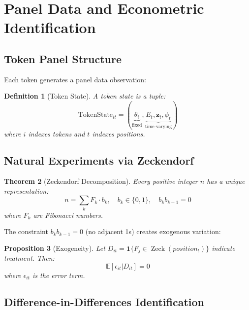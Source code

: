 \documentclass[11pt,a4paper]{article}
\newtheorem{theorem}{Theorem}
\newtheorem{proposition}[theorem]{Proposition}
\newtheorem{definition}[theorem]{Definition}
\newcommand{\E}{\mathbb{E}}
\DeclareMathOperator{\Zeck}{Zeck}
\begin{document}
\section{Panel Data and Econometric Identification}

\subsection{Token Panel Structure}

Each token generates a panel data observation:

\begin{definition}[Token State]
A token state is a tuple:
\begin{equation}
    \text{TokenState}_{it} = \left( \underbrace{\theta_i}_{\text{fixed}}, \underbrace{E_t, \mathbf{z}_t, \phi_t}_{\text{time-varying}} \right)
\end{equation}
where $i$ indexes tokens and $t$ indexes positions.
\end{definition}

\subsection{Natural Experiments via Zeckendorf}

\begin{theorem}[Zeckendorf Decomposition]
Every positive integer $n$ has a unique representation:
\begin{equation}
    n = \sum_{k} F_k \cdot b_k, \quad b_k \in \{0,1\}, \quad b_k b_{k-1} = 0
\end{equation}
where $F_k$ are Fibonacci numbers.
\end{theorem}

The constraint $b_k b_{k-1} = 0$ (no adjacent 1s) creates exogenous variation:

\begin{proposition}[Exogeneity]
Let $D_{it} = \mathbf{1}\{F_j \in \Zeck(position_t)\}$ indicate treatment. Then:
\begin{equation}
    \E[\epsilon_{it} | D_{it}] = 0
\end{equation}
where $\epsilon_{it}$ is the error term.
\end{proposition}

\subsection{Difference-in-Differences Identification}
\end{document}
